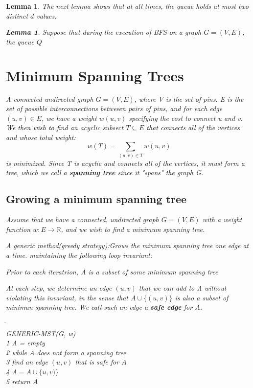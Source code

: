 \documentclass[a4paper,11pt]{book}
\newtheorem{lemma}[theorem]{Lemma}
\begin{document}
{\begin{lemma}
The next lemma shows that at all times, the queue holds at most two distinct $d$
values.
\begin{lemma}
Suppose that during the execution of BFS on a graph $G=(V,E)$, the queue $Q$

\section{Minimum Spanning Trees}
A connected undirected graph $G = (V, E)$, where V is the set of pins. E is the set of possible interconnections betweeen pairs of pins, and for each edge $(u,v)\in E$, we have a weight $w(u, v)$ specifying the cost to connect u and v. We then wish to find an acyclic subsect $T\subseteq E$ that connects all of the vertices and whose total weight:\[w(T) = \sum_{(u,v)\in T}w(u,v)\] is \emph{minimized}. Since T is \emph{acyclic and connects all of the vertices, it must form a tree}, which we call a \textbf{ spanning tree} since it "spans" the graph G.
\subsection{Growing a minimum spanning tree}
Assume that we have a connected, undirected graph $G = (V, E)$ with a weight function $w:E \rightarrow \mathbb{R}$, and we wish to find a minimum spanning tree.

A generic method(greedy strategy):Grows the minimum spanning tree one edge at a time. maintaining the following loop invariant:
\begin{center}
Prior to each iteratrion, A is a subset of some minimum spanning tree
\end{center}

At each step, we determine an edge $(u, v)$ that we can add to A without violating this invariant, in the sense that $A\cup \{(u,v)\}$ is also a subset of minimun spanning tree. We call such an edge a \textbf{safe edge} for $A$.
\begin{tabbing}
\hspace{.8cm}\=\hspace{.8cm}\=\\
GENERIC-MST(G, w)\\
1\> A = empty\\
2\> while A does not form a spanning tree\\
3\>\>   find an edge $(u, v)$ that is safe for $A$\\
4\>\> $A=A\cup \{u, v)\}$\\
5\> return $A$\\
\end{tabbing}


\end{lemma}
\end{lemma}}
\end{document}
